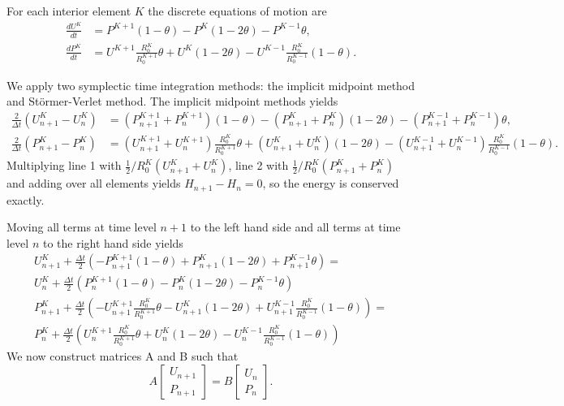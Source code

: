 \documentclass{article}
\begin{document}
For each interior element $K$ the discrete equations of motion are
\begin{equation}
	\begin{aligned}
		\frac{d U^K}{d t} &=  P^{K+1} (1-\theta)- P^K (1-2\theta) - P^{K-1}\theta, \\
		\frac{d P^K}{d t} &= U^{K+1} \frac{R_0^K}{R_0^{K+1}} \theta + U^K (1-2\theta) - U^{K-1} \frac{R_0^K}{R_0^{K-1}}(1-\theta).
	\end{aligned}
\end{equation}

We apply two symplectic time integration methods: the implicit midpoint method and St\"{o}rmer-Verlet method. The implicit midpoint methods yields
\begin{equation}
	\begin{aligned}
		\frac{2}{\Delta t} \left(U^K_{n+1}-U^K_n\right) &= \left(P_{n+1}^{K+1}+P_n^{K+1}\right) (1-\theta)- \left(P_{n+1}^K+P_n^K\right) (1-2\theta) - \left(P_{n+1}^{K-1}+P_n^{K-1}\right) \theta, \\
		\frac{2 }{\Delta t} \left(P^K_{n+1}-P^K_n\right) &= \left(U_{n+1}^{K+1}+U_n^{K+1}\right) \frac{R_0^K}{R_0^{K+1}} \theta + \left(U_{n+1}^K + U_n^K\right) (1-2\theta) - \left(U_{n+1}^{K-1}+U_n^{K-1}\right) \frac{R_0^K}{R_0^{K-1}}(1-\theta).
	\end{aligned}
\end{equation}
Multiplying line 1 with $\frac{1}{2}/R_0^K (U^K_{n+1}+U^K_n)$, line 2 with 
$\frac{1}{2}/R_0^K (P^K_{n+1}+P^K_n)$ and adding over all elements yields $H_{n+1} - H_n = 0$, so the energy is conserved exactly.

Moving all terms at time level $n+1$ to the left hand side and all terms at time level $n$ to the right hand side yields
\begin{equation}
	\begin{aligned}
		U_{n+1}^K + \frac{\Delta t}{2} \left(-P_{n+1}^{K+1} (1-\theta) + P_{n+1}^K (1-2\theta) + P_{n+1}^{K-1} \theta \right) = \\
		U_n^K + \frac{\Delta t}{2} \left(P_{n}^{K+1} (1-\theta) - P_{n}^K (1-2\theta) - P_{n}^{K-1} \theta \right) \\
		P_{n+1}^K + \frac{\Delta t}{2} \left(-U_{n+1}^{K+1} \frac{R_0^K}{R_0^{K+1}} \theta - U_{n+1}^K (1-2\theta) + U_{n+1}^{K-1} \frac{R_0^K}{R_0^{K-1}}(1-\theta) \right) = \\
		P_{n}^K + \frac{\Delta t}{2 } \left(U_{n}^{K+1} \frac{R_0^K}{R_0^{K+1}} \theta + U_{n}^K (1-2\theta) - U_{n}^{K-1} \frac{R_0^K}{R_0^{K-1}}(1-\theta) \right)
	\end{aligned}
\end{equation}
We now construct matrices A and B such that
\begin{equation}
	A \left[ \begin{array}{c} U_{n+1} \\ P_{n+1} \end{array} \right] = B \left[ \begin{array}{c} U_{n} \\ P_{n} \end{array} \right].
\end{equation}
\end{document}
